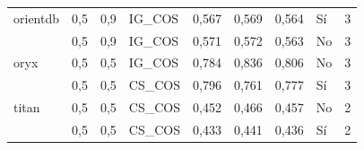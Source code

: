 \begin{table}[H]
{{\begin{tabular}{lllllllll}
orientdb                             & 0,5                               & 0,9                            & IG\_COS                                     & 0,567                                  & 0,569                               & 0,564                                 & Sí                               & 3                                         \\
                             & 0,5                               & 0,9                            & IG\_COS                                     & 0,571                                  & 0,572                               & 0,563                                 & No                                   & 3                                         \\
oryx                                 & 0,5                               & 0,5                            & IG\_COS                                     & 0,784                                  & 0,836                               & 0,806                                 & No                                   & 3                                         \\
                                 & 0,5                               & 0,5                            & CS\_COS                                     & 0,796                                  & 0,761                               & 0,777                                 & Sí                               & 3                                         \\
titan                                & 0,5                               & 0,5                            & CS\_COS                                     & 0,452                                  & 0,466                               & 0,457                                 & No                                   & 2                                         \\
                                & 0,5                               & 0,5                            & CS\_COS                                     & 0,433                                  & 0,441                               & 0,436                                 & Sí                               & 2                                        
\\\bottomrule
\end{tabular}%
}
}

\end{table}